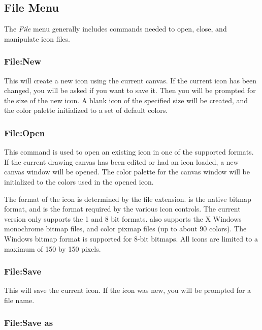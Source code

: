 \subsection {File Menu}

The \emph{File} menu generally includes commands needed to
open, close, and manipulate icon files.

\subsubsection*{File:New}

This will create a new icon using the current canvas. If the
current icon has been changed, you will be asked if you want
to save it. Then you will be prompted for the size of the
new icon. A blank icon of the specified size will be created,
and the color palette initialized to a set of default colors.

\subsubsection*{File:Open}

This command is used to open an existing icon in one of
the supported formats. If the current drawing canvas has
been edited or had an icon loaded, a new canvas window
will be opened. The color palette for the canvas window
will be initialized to the colors used in the opened icon.

The format of the icon is determined by the file extension.
 is the native \V bitmap format, and is the format
required by the various \V icon controls.  The current version
only supports the 1 and 8 bit  formats. 
also supports the X Windows  monochrome bitmap files,
and  color pixmap files (up to about 90 colors).
The Windows  bitmap format is supported for
8-bit bitmaps. All icons are limited to a maximum of
150 by 150 pixels.

\subsubsection*{File:Save}

This will save the current icon. If the icon was new, you
will be prompted for a file name.

\subsubsection*{File:Save as}

